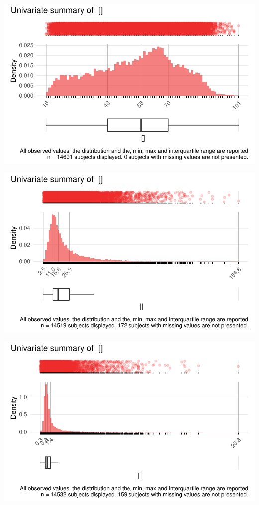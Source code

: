 \documentclass[
  letterpaper,
  DIV=11,
  numbers=noendperiod]{scrreport}
\begin{document}
\includegraphics{./Bact_univar_files/figure-pdf/uni02-2.pdf}

\includegraphics{./Bact_univar_files/figure-pdf/uni02-3.pdf}

\includegraphics{./Bact_univar_files/figure-pdf/uni02-4.pdf}
\end{document}
